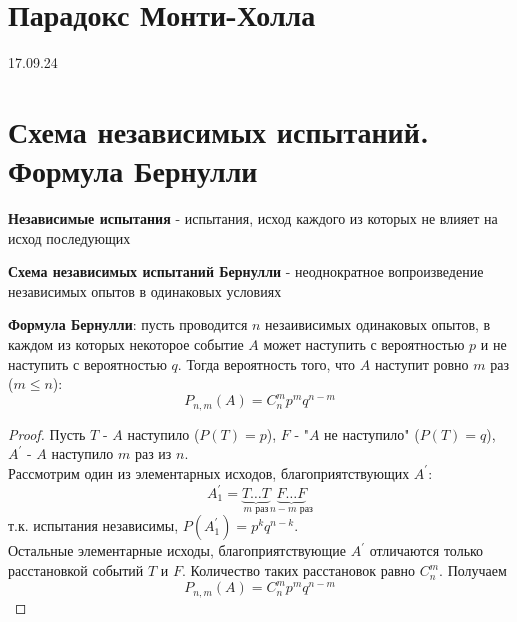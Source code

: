     \section{Парадокс Монти-Холла}




    \vspace{2cm}
    \begin{center}\large{17.09.24}\end{center}
    \section{Схема независимых испытаний. Формула Бернулли}

    \begin{opr}
        \textbf{Независимые испытания} - испытания, исход каждого
        из которых не влияет на исход последующих
    \end{opr}

    \begin{opr}
        \textbf{Схема независимых испытаний Бернулли} - неоднократное
        вопроизведение независимых опытов в одинаковых условиях
    \end{opr}

    \begin{thm}
        \textbf{Формула Бернулли}: пусть проводится \(n\) незаивисимых одинаковых опытов, 
        в каждом из которых некоторое событие \(A\) может наступить с вероятностью \(p\) 
        и не наступить с вероятностью \(q\). Тогда вероятность того, что \(A\) наступит 
        ровно \(m\) раз (\(m \leq n\)):
        \begin{equation}
            P_{n, m}(A) = C^{m}_{n} p^{m} q^{n - m}
        \end{equation}

        \begin{proof}
            Пусть \(T\) - \(A\) наступило (\(P(T) = p\)), \(F\) - "\(A\) не наступило" 
            (\(P(T) = q\)), \(A^{'}\) - \( A \) наступило \(m\) раз из \(n\).\\
            Рассмотрим один из элементарных исходов, благоприятствующих 
            \(A^{'}\):
            \begin{equation}
                A_{1}^{'} = \underbrace{T\dots T}_{\text{\(m\) раз}}
                            \underbrace{F\dots F}_{\text{\(n - m\) раз}}
            \end{equation}
            т.к. испытания независимы, \(P(A_{1}^{'}) = p^{k}q^{n - k}\).\\
            Остальные элементарные исходы, благоприятствующие \(A^{'}\)
            отличаются только расстановкой событий \(T\) и \(F\). Количество таких 
            расстановок равно \(C^{m}_{n}\). Получаем
            \begin{equation}
                P_{n, m}(A) = C^{m}_{n} p^{m} q^{n - m}
            \end{equation}
        \end{proof}
    \end{thm}

